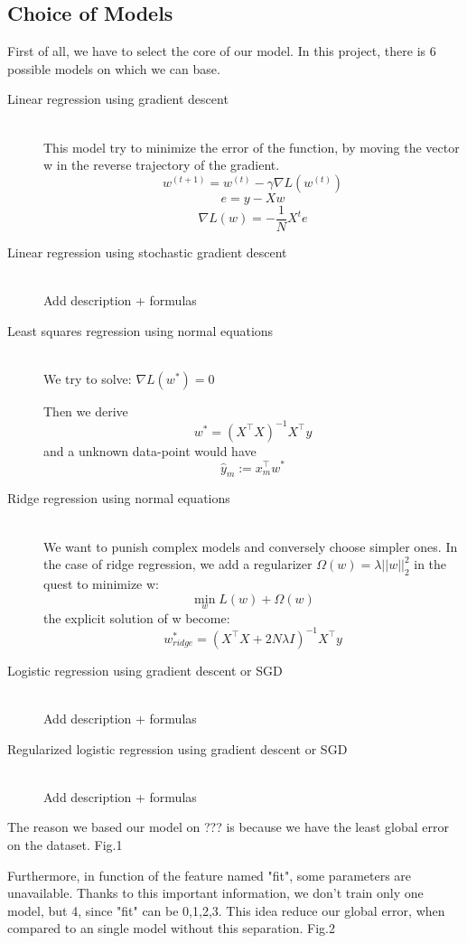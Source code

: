 \documentclass[10pt,conference,compsocconf]{IEEEtran}
\begin{document}
\subsection{Choice of Models}
First of all, we have to select the core of our model. In this project, there is 6 possible models on which we can base.
\begin{description}
	\item[Linear regression using gradient descent] \ \\
	
	This model try to minimize the error of the function, by moving the vector w in the reverse trajectory of the gradient.
	$$w^{(t+1)}=w^{(t)} -\gamma \nabla L(w^{(t)})$$
	$$e = y-Xw$$
	$$\nabla L(w) = -\frac{1}{N}X^te$$
	
	\item[Linear regression using stochastic gradient descent] \ \\
	
	Add description + formulas
	
	
	\item[Least squares regression using normal equations] \ \\
	
	We try to solve: $\nabla L(w^*) = 0$
	
	Then we derive
	$$w^* = (X^\top X)^{-1}X^\top y$$
	and a unknown data-point would have 
	$$\hat y_m := x_m^\top w^*$$
	
	\item[Ridge regression using normal equations] \ \\
	
	We want to punish complex models and conversely choose simpler ones.
	In the case of ridge regression, we add a regularizer $\Omega(w) = \lambda||w||_2^2$ in the quest to minimize w:
	$$\min\limits_{w} L(w) + \Omega(w)$$
	the explicit solution of w become:
	$$w_{ridge}^* = (X^\top X+2N\lambda I)^{-1}X^\top y$$
	\item[Logistic regression using gradient descent or SGD] \ \\
	Add description + formulas
	\item[Regularized logistic regression using gradient descent or SGD] \ \\
	Add description + formulas
\end{description}

The reason we based our model on ??? is because we have the least global error on the dataset. Fig.1 

Furthermore, in function of the feature named "fit", some parameters are unavailable. Thanks to this important information, we don't train only one model, but 4, since "fit" can be {0,1,2,3}.
This idea reduce our global error, when compared to an single model without this separation. Fig.2
\end{document}
